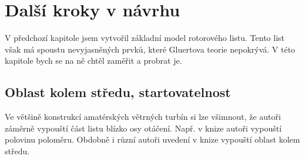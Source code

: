 \chapter{Další kroky v návrhu}\label{chap:kroky}
V předchozí kapitole jsem vytvořil základní model rotorového listu. Tento list však má spoustu nevyjasněných prvků, které Gluertova teorie nepokrývá. V této kapitole bych se na ně chtěl zaměřit a probrat je.

\section{Oblast kolem středu, startovatelnost}
Ve většině konstrukcí amatérských větrných turbín si lze všimnout, že autoři záměrně vypouští část listu blízko osy otáčení. Např. v knize \cite{Crome:Technika} autoři vypouští polovinu poloměru. Obdobně i různí autoři uvedení v knize \cite{Hallenga:Elektrarna} vypouští oblast kolem středu.

